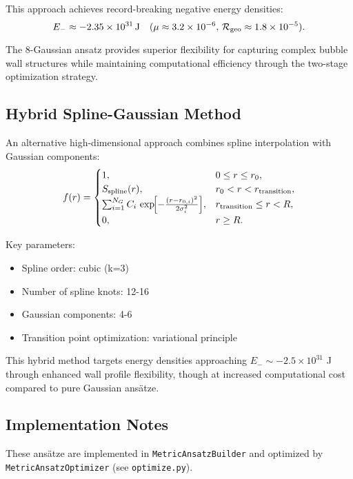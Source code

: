 This approach achieves record-breaking negative energy densities:
\[
  E_- \approx -2.35\times10^{31}\,\text{J}
  \quad(\mu \approx 3.2\times10^{-6},\,\mathcal{R}_{\rm geo} \approx 1.8\times10^{-5}).
\]

The 8-Gaussian ansatz provides superior flexibility for capturing complex bubble wall structures while maintaining computational efficiency through the two-stage optimization strategy.

\subsection{Hybrid Spline-Gaussian Method}
An alternative high-dimensional approach combines spline interpolation with Gaussian components:
\[
  f(r) = 
  \begin{cases}
    1, & 0 \le r \le r_0,\\
    S_{\text{spline}}(r), & r_0 < r < r_{\text{transition}},\\
    \sum_{i=1}^{N_G} C_i\,\exp\!\Bigl[-\tfrac{(r - r_{0,i})^2}{2\sigma_i^2}\Bigr], & r_{\text{transition}} \le r < R,\\
    0, & r \ge R.
  \end{cases}
\]

Key parameters:
\begin{itemize}
\item Spline order: cubic (k=3)
\item Number of spline knots: 12-16
\item Gaussian components: 4-6
\item Transition point optimization: variational principle
\end{itemize}

This hybrid method targets energy densities approaching $E_- \sim -2.5\times10^{31}$ J through enhanced wall profile flexibility, though at increased computational cost compared to pure Gaussian ansätze.

\subsection{Implementation Notes}
These ansätze are implemented in \texttt{MetricAnsatzBuilder} and optimized by \texttt{MetricAnsatzOptimizer} (see \texttt{optimize.py}).
